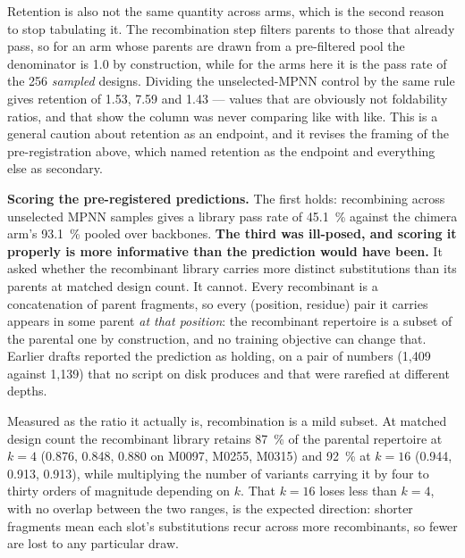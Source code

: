 Retention is also not the same quantity across arms, which is the second reason
to stop tabulating it. The recombination step filters parents to those that
already pass, so for an arm whose parents are drawn from a pre-filtered pool the
denominator is 1.0 by construction, while for the arms here it is the pass rate
of the 256 \emph{sampled} designs. Dividing the unselected-MPNN control by the
same rule gives retention of 1.53, 7.59 and 1.43 --- values that are obviously
not foldability ratios, and that show the column was never comparing like with
like. This is a general caution about retention as an
endpoint, and it revises the framing of the pre-registration above, which named
retention as the endpoint and everything else as secondary.

\textbf{Scoring the pre-registered predictions.} The first holds: recombining
across unselected MPNN samples gives a library pass rate of \SI{45.1}{\percent}
against the chimera arm's \SI{93.1}{\percent} pooled over backbones. \textbf{The third was
ill-posed, and scoring it properly is more informative than the prediction
would have been.} It asked whether the recombinant library carries more
distinct substitutions than its parents at matched design count. It cannot.
Every recombinant is a concatenation of parent fragments, so every
(position, residue) pair it carries appears in some parent \emph{at that
position}: the recombinant repertoire is a subset of the parental one by
construction, and no training objective can change that. Earlier drafts
reported the prediction as holding, on a pair of numbers (1{,}409 against
1{,}139) that no script on disk produces and that were rarefied at different
depths.

Measured as the ratio it actually is, recombination is a mild subset. At
matched design count the recombinant library retains \SI{87}{\percent} of the
parental repertoire at $k=4$ (0.876, 0.848, 0.880 on M0097, M0255, M0315) and
\SI{92}{\percent} at $k=16$ (0.944, 0.913, 0.913), while multiplying the number
of variants carrying it by four to thirty orders of magnitude depending on $k$.
That $k=16$ loses less than $k=4$, with no overlap between the two ranges, is
the expected direction: shorter fragments mean each slot's substitutions recur
across more recombinants, so fewer are lost to any particular draw.

